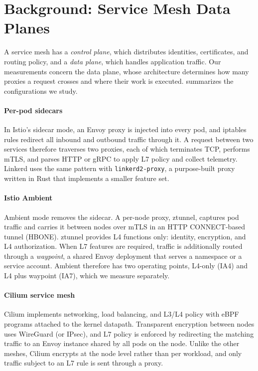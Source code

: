 \section{Background: Service Mesh Data Planes}
\label{sec:background}

A service mesh has a \emph{control plane}, which distributes identities,
certificates, and routing policy, and a \emph{data plane}, which handles
application traffic. Our measurements concern the data plane, whose
architecture determines how many proxies a request crosses and where their work
is executed.  summarizes the configurations we study.

\paragraph{Per-pod sidecars}
In Istio's sidecar mode, an Envoy proxy is injected into every pod, and
iptables rules redirect all inbound and outbound traffic through it. A request
between two services therefore traverses two proxies, each of which terminates
TCP, performs mTLS, and parses HTTP or gRPC to apply L7 policy and collect
telemetry. Linkerd uses the same pattern with \texttt{linkerd2-proxy}, a
purpose-built proxy written in Rust that implements a smaller feature set.

\paragraph{Istio Ambient}
Ambient mode removes the sidecar. A per-node proxy, ztunnel, captures pod
traffic and carries it between nodes over mTLS in an HTTP CONNECT-based tunnel
(HBONE). ztunnel provides L4 functions only: identity, encryption, and L4
authorization. When L7 features are required, traffic is additionally routed
through a \emph{waypoint}, a shared Envoy deployment that serves a namespace or
a service account. Ambient therefore has two operating points, L4-only (IA4)
and L4 plus waypoint (IA7), which we measure separately.

\paragraph{Cilium service mesh}
Cilium implements networking, load balancing, and L3/L4 policy with eBPF
programs attached to the kernel datapath. Transparent encryption between nodes
uses WireGuard (or IPsec), and L7 policy is enforced by redirecting the matching
traffic to an Envoy instance shared by all pods on the node. Unlike the other
meshes, Cilium encrypts at the node level rather than per workload, and only
traffic subject to an L7 rule is sent through a proxy.


